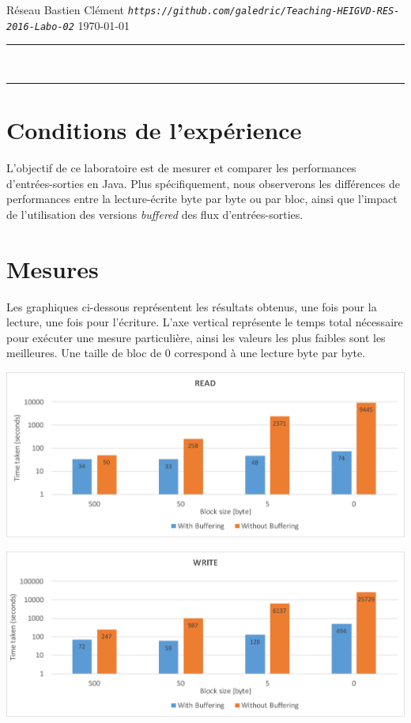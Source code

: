 \documentclass[a4paper,11pt]{article}
\begin{document}
	
{\sc Réseau} \hfill Bastien Clément\newline 
{\tt \em https://github.com/galedric/Teaching-HEIGVD-RES-2016-Labo-02} \hfill \today \newline
\hrule
\vspace{5mm}
\\[1.5mm]
\hrule
\vspace{3mm}

\section{Conditions de l'expérience}

L'objectif de ce laboratoire est de mesurer et comparer les performances d'entrées-sorties en Java. Plus spécifiquement, nous observerons les différences de performances entre la lecture-écrite byte par byte ou par bloc, ainsi que l'impact de l'utilisation des versions \emph{buffered} des flux d'entrées-sorties.

\section{Mesures}

Les graphiques ci-dessous représentent les résultats obtenus, une fois pour la lecture, une fois pour l'écriture. L'axe vertical représente le temps total nécessaire pour exécuter une mesure particulière, ainsi les valeurs les plus faibles sont les meilleures. Une taille de bloc de 0 correspond à une lecture byte par byte.\\

\begin{center}
	\includegraphics[width=16cm]{read}
	
	\includegraphics[width=16cm]{write}
\end{center}
\end{document}
